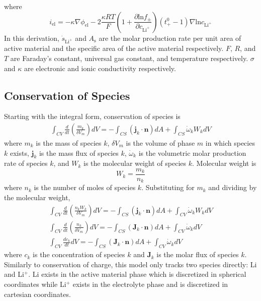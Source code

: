 \documentclass[12pt]{article}
\begin{document}
		where 
		\begin{equation}
			i_\text{el} = -\kappa \nabla \phi_{\text{el}} - 2\frac{\kappa RT}{F}\left(1+\frac{\partial \text{ln} f_\pm}{\partial c_{\text{Li}^+}} \right) \left( t_+^0 - 1 \right) \nabla \text{ln} c_{\text{Li}^+}
		\end{equation}
		In this derivation, $\dot{s}_{\text{Li}^+}$ and $A_\text{s}$ are the molar production rate per unit area of active material and the specific area of the active material respectively. $F$, $R$, and $T$ are Faraday's constant, universal gas constant, and temperature respectively. $\sigma$ and $\kappa$ are electronic and ionic conductivity respectively.
	\subsection{Conservation of Species}
		Starting with the integral form, conservation of species is
		\begin{gather}
			\int_{CV} \frac{d}{dt}\left(\frac{m_k}{\delta V_m}\right) dV = -\int_{CS} (\mathbf{j}_k \cdot \mathbf{n}) dA + \int_{CS} \dot{\omega}_k W_k dV
		\end{gather}
		where $m_k$ is the mass of species $k$, $\delta V_m$ is the volume of phase $m$ in which species $k$ exists, $\mathbf{j}_k$ is the mass flux of species $k$, $\dot{\omega}_k$ is the volumetric molar production rate of species $k$, and $W_k$ is the molecular weight of species $k$. Molecular weight is 
		\begin{equation}
			W_k = \frac{m_k}{n_k}
		\end{equation}
		where $n_k$ is the number of moles of species $k$. Substituting for $m_k$ and dividing by the molecular weight, 
		\begin{gather}
			\int_{CV} \frac{d}{dt}\left(\frac{n_kW_k}{\delta V_m}\right) dV = -\int_{CS} (\mathbf{j}_k \cdot \mathbf{n}) dA + \int_{CV} \dot{\omega}_k W_k dV\\
			\int_{CV} \frac{d}{dt}\left(\frac{n_k}{\delta V_m}\right) dV = -\int_{CS} (\mathbf{J}_k \cdot \mathbf{n}) dA + \int_{CV} \dot{\omega}_k dV\\
			\int_{CV} \frac{dc_k}{dt} dV = -\int_{CS} (\mathbf{J}_k \cdot \mathbf{n}) dA + \int_{CV} \dot{\omega}_k dV
		\end{gather}
		where $c_k$ is the concentration of species $k$ and $\mathbf{J}_k$ is the molar flux of species $k$.\\
		Similarly to conservation of charge, this model only tracks two species directly: Li and Li$^+$. Li exists in the active material phase which is discretized in spherical coordinates while Li$^+$ exists in the electrolyte phase and is discretized in cartesian coordinates.
\end{document}
